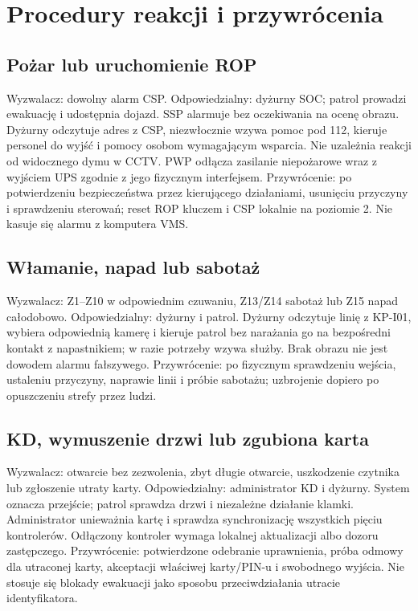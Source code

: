 \section{Procedury reakcji i przywrócenia}
\subsection*{Pożar lub uruchomienie ROP}
Wyzwalacz: dowolny alarm CSP. Odpowiedzialny: dyżurny SOC; patrol prowadzi ewakuację i udostępnia dojazd. SSP alarmuje bez oczekiwania na ocenę obrazu. Dyżurny odczytuje adres z CSP, niezwłocznie wzywa pomoc pod 112, kieruje personel do wyjść i pomocy osobom wymagającym wsparcia. Nie uzależnia reakcji od widocznego dymu w CCTV. PWP odłącza zasilanie niepożarowe wraz z wyjściem UPS zgodnie z jego fizycznym interfejsem. Przywrócenie: po potwierdzeniu bezpieczeństwa przez kierującego działaniami, usunięciu przyczyny i sprawdzeniu sterowań; reset ROP kluczem i CSP lokalnie na poziomie 2. Nie kasuje się alarmu z komputera VMS.

\subsection*{Włamanie, napad lub sabotaż}
Wyzwalacz: Z1--Z10 w odpowiednim czuwaniu, Z13/Z14 sabotaż lub Z15 napad całodobowo. Odpowiedzialny: dyżurny i patrol. Dyżurny odczytuje linię z KP-I01, wybiera odpowiednią kamerę i kieruje patrol bez narażania go na bezpośredni kontakt z napastnikiem; w razie potrzeby wzywa służby. Brak obrazu nie jest dowodem alarmu fałszywego. Przywrócenie: po fizycznym sprawdzeniu wejścia, ustaleniu przyczyny, naprawie linii i próbie sabotażu; uzbrojenie dopiero po opuszczeniu strefy przez ludzi.

\subsection*{KD, wymuszenie drzwi lub zgubiona karta}
Wyzwalacz: otwarcie bez zezwolenia, zbyt długie otwarcie, uszkodzenie czytnika lub zgłoszenie utraty karty. Odpowiedzialny: administrator KD i dyżurny. System oznacza przejście; patrol sprawdza drzwi i niezależne działanie klamki. Administrator unieważnia kartę i sprawdza synchronizację wszystkich pięciu kontrolerów. Odłączony kontroler wymaga lokalnej aktualizacji albo dozoru zastępczego. Przywrócenie: potwierdzone odebranie uprawnienia, próba odmowy dla utraconej karty, akceptacji właściwej karty/PIN-u i swobodnego wyjścia. Nie stosuje się blokady ewakuacji jako sposobu przeciwdziałania utracie identyfikatora.

